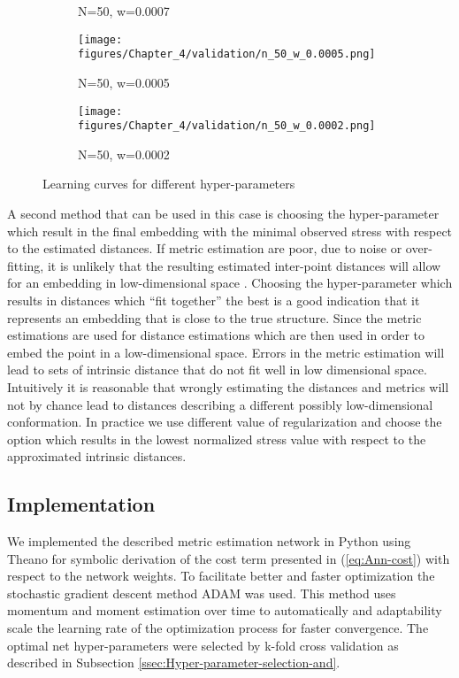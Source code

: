 \begin{figure}[h]
\begin{centering}
\begin{subfigure}[b]{0.28\linewidth}
				\caption{N=50, w=0.0007}
			\end{subfigure}\hfill
			\begin{subfigure}[b]{0.28\linewidth}
				\texttt{[image: figures/Chapter\_4/validation/n\_50\_w\_0.0005.png]}
				\caption{N=50, w=0.0005}
			\end{subfigure} \hfill 
			\begin{subfigure}[b]{0.28\linewidth}
				\texttt{[image: figures/Chapter\_4/validation/n\_50\_w\_0.0002.png]}
				\caption{N=50, w=0.0002}
			\end{subfigure}
		\end{centering}
		\caption{Learning curves for different hyper-parameters \label{fig:learning_curves} }   
	\end{figure}	
	
	A second method that can be used in this case is choosing the hyper-parameter which result in the final embedding with the minimal observed stress with respect to the estimated distances. If metric estimation are poor, due to noise or over-fitting, it is unlikely that the resulting estimated inter-point distances will allow for an embedding in low-dimensional space . Choosing the hyper-parameter which results in distances which ``fit together'' the best is a good indication that it represents an embedding that is close to the true structure. Since the metric estimations are used for distance estimations which are then used in order to embed the point in a low-dimensional space. Errors in the metric estimation will lead to sets of intrinsic distance that do not fit well in low dimensional space. Intuitively it is reasonable that wrongly estimating the distances and metrics will not by chance lead to distances describing a different possibly low-dimensional conformation. In practice we use different value of regularization and choose the option which results in the lowest normalized stress value with respect to the approximated intrinsic distances.
	
	\subsection{Implementation}
		\label{ssec:Net_implementation}
		We implemented the described metric estimation network in Python using Theano \cite{bergstra2010theano} for symbolic derivation of the cost term presented in (\cref{eq:Ann-cost}) with respect to the network weights. To facilitate better and faster optimization the stochastic gradient descent method \ac{ADAM} \cite{kingma2014adam} was used. This method uses momentum and moment estimation over time to automatically and adaptability scale the learning rate of the optimization process for faster convergence. The optimal net hyper-parameters were selected by k-fold cross validation as described in Subsection \cref{ssec:Hyper-parameter-selection-and}.
	